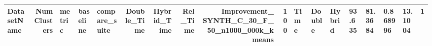 \begin{tabular}{lrlllrrrrr}
\toprule
DatasetName & NumClusters & metric & baseline & compare_suite & Double_Time & Hybrid_Time & Rel_Time & Improvement_%
\midrule
SYNTH_C_30_F_50_n1000_000k_kmeans & 100 & Time & Double & Hybrid & 93.635 & 81.3684 & 0.868996 & 13.1004 & 1 \\
\bottomrule
\end{tabular}
